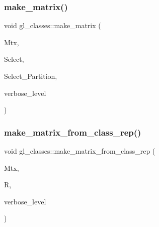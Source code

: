 \subsubsection{\texorpdfstring{make\+\_\+matrix()}{make\_matrix()}}
{\footnotesize\ttfamily void gl\+\_\+classes\+::make\+\_\+matrix (\begin{DoxyParamCaption}\item[{\mbox{\hyperlink{galois_8h_a09fddde158a3a20bd2dcadb609de11dc}{I\+NT}} $\ast$}]{Mtx,  }\item[{\mbox{\hyperlink{galois_8h_a09fddde158a3a20bd2dcadb609de11dc}{I\+NT}} $\ast$}]{Select,  }\item[{\mbox{\hyperlink{galois_8h_a09fddde158a3a20bd2dcadb609de11dc}{I\+NT}} $\ast$}]{Select\+\_\+\+Partition,  }\item[{\mbox{\hyperlink{galois_8h_a09fddde158a3a20bd2dcadb609de11dc}{I\+NT}}}]{verbose\+\_\+level }\end{DoxyParamCaption})}

\mbox{\label{classgl__classes_a116d52ea110596476a2386bc58f88899}} 
\subsubsection{\texorpdfstring{make\+\_\+matrix\+\_\+from\+\_\+class\+\_\+rep()}{make\_matrix\_from\_class\_rep()}}
{\footnotesize\ttfamily void gl\+\_\+classes\+::make\+\_\+matrix\+\_\+from\+\_\+class\+\_\+rep (\begin{DoxyParamCaption}\item[{\mbox{\hyperlink{galois_8h_a09fddde158a3a20bd2dcadb609de11dc}{I\+NT}} $\ast$}]{Mtx,  }\item[{\mbox{\hyperlink{classgl__class__rep}{gl\+\_\+class\+\_\+rep}} $\ast$}]{R,  }\item[{\mbox{\hyperlink{galois_8h_a09fddde158a3a20bd2dcadb609de11dc}{I\+NT}}}]{verbose\+\_\+level }\end{DoxyParamCaption})}

\mbox{\label{classgl__classes_a46bfab85f702dcb50eaecdd7c43fba35}} 
